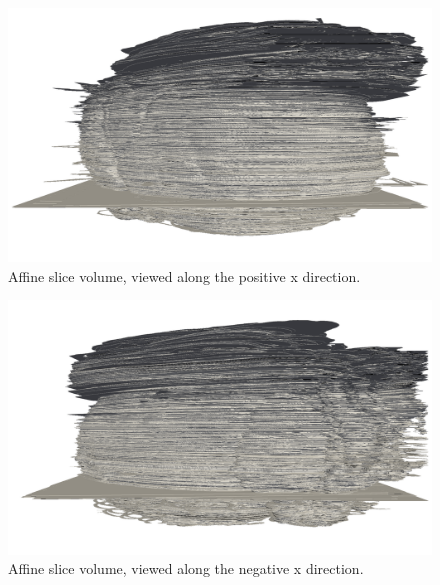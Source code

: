 	\begin{figure}
	  \centering
	  \includegraphics[width=0.9\textheight]{Ch6/Figs/Rat28/contours/whole_positive_x_affine}
	  \caption{Affine slice volume, viewed along the positive x direction.}
	  \label{fig:positive_x_affine_contour}
	\end{figure}

	\begin{figure}
	  \centering
	  \includegraphics[width=0.9\textheight]{Ch6/Figs/Rat28/contours/whole_negative_x_affine}
	  \caption{Affine slice volume, viewed along the negative x direction.}
	  \label{fig:negative_x_affine_contour}
	\end{figure}

